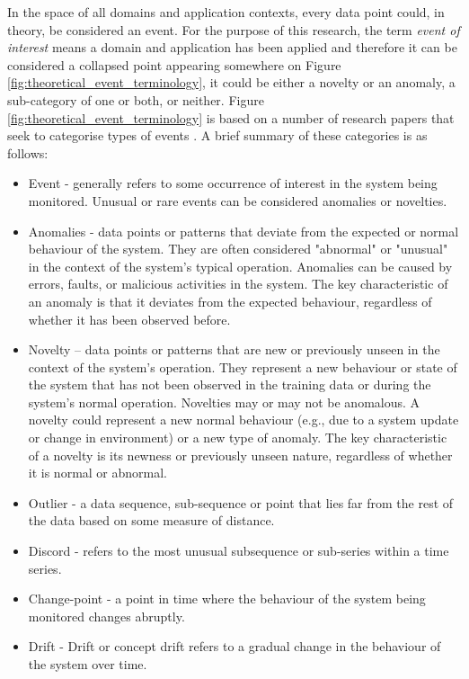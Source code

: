 In the space of all domains and application contexts, every data point could, in theory, be considered an event. For the purpose of this research, the term \textit{event of interest} means a domain and application has been applied and therefore it can be considered a collapsed point appearing somewhere on Figure \ref{fig:theoretical_event_terminology}, it could be either a novelty or an anomaly, a sub-category of one or both, or neither. Figure \ref{fig:theoretical_event_terminology} is based on a number of research papers that seek to categorise types of events \citep{chandolaAnomalyDetectionSurvey2009,pimentelReviewNoveltyDetection2014,ahmadUnsupervisedRealtimeAnomaly2017,aminikhanghahiSurveyMethodsTime2017}. A brief summary of these categories is as follows:

\begin{itemize}
    \item Event - generally refers to some occurrence of interest in the system being monitored. Unusual or rare events can be considered anomalies or novelties.
    \item Anomalies - data points or patterns that deviate from the expected or normal behaviour of the system. They are often considered "abnormal" or "unusual" in the context of the system's typical operation. Anomalies can be caused by errors, faults, or malicious activities in the system. The key characteristic of an anomaly is that it deviates from the expected behaviour, regardless of whether it has been observed before.
    \item Novelty – data points or patterns that are new or previously unseen in the context of the system's operation. They represent a new behaviour or state of the system that has not been observed in the training data or during the system's normal operation. Novelties may or may not be anomalous. A novelty could represent a new normal behaviour (e.g., due to a system update or change in environment) or a new type of anomaly. The key characteristic of a novelty is its newness or previously unseen nature, regardless of whether it is normal or abnormal.
    \item Outlier - a data sequence, sub-sequence or point that lies far from the rest of the data based on some measure of distance.
    \item Discord - refers to the most unusual subsequence or sub-series within a time series.
    \item Change-point - a point in time where the behaviour of the system being monitored changes abruptly.
    \item Drift - Drift or concept drift refers to a gradual change in the behaviour of the system over time.
\end{itemize}

